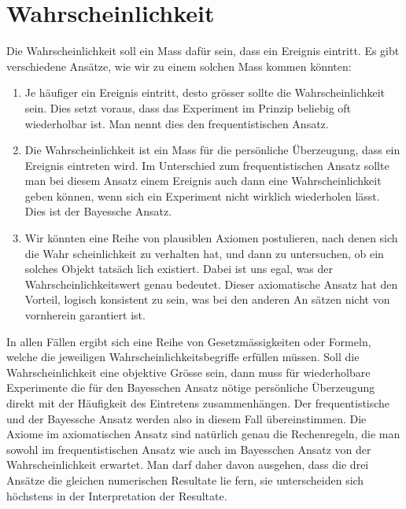 \documentclass[../Main.tex]{subfiles}
\begin{document}
\section{Wahrscheinlichkeit}
Die Wahrscheinlichkeit soll ein Mass dafür sein, dass ein Ereignis eintritt. Es gibt verschiedene Ansätze, wie wir zu einem solchen Mass kommen könnten: 
\begin{enumerate}
    \item Je häufiger ein Ereignis eintritt, desto grösser sollte die Wahrscheinlichkeit sein. Dies setzt voraus, dass das Experiment im Prinzip beliebig oft wiederholbar ist. Man nennt dies den frequentistischen Ansatz. 
    \item Die Wahrscheinlichkeit ist ein Mass für die persönliche Überzeugung, dass ein Ereignis eintreten wird. Im Unterschied zum frequentistischen Ansatz sollte man bei diesem Ansatz einem Ereignis auch dann eine Wahrscheinlichkeit geben können, wenn sich ein Experiment nicht wirklich wiederholen lässt. Dies ist der Bayessche Ansatz. 
    \item Wir könnten eine Reihe von plausiblen Axiomen postulieren, nach denen sich die Wahr scheinlichkeit zu verhalten hat, und dann zu untersuchen, ob ein solches Objekt tatsäch lich existiert. Dabei ist uns egal, was der Wahrscheinlichkeitswert genau bedeutet. Dieser axiomatische Ansatz hat den Vorteil, logisch konsistent zu sein, was bei den anderen An sätzen nicht von vornherein garantiert ist. 
\end{enumerate}

In allen Fällen ergibt sich eine Reihe von Gesetzmässigkeiten oder Formeln, welche die jeweiligen Wahrscheinlichkeitsbegriffe erfüllen müssen. Soll die Wahrscheinlichkeit eine objektive Grösse sein, dann muss für wiederholbare Experimente die für den Bayesschen Ansatz nötige persönliche Überzeugung direkt mit der Häufigkeit des Eintretens zusammenhängen. Der frequentistische und der Bayessche Ansatz werden also in diesem Fall übereinstimmen. Die Axiome im axiomatischen Ansatz sind natürlich genau die Rechenregeln, die man sowohl im frequentistischen Ansatz wie auch im Bayesschen Ansatz von der Wahrscheinlichkeit erwartet. Man darf daher davon ausgehen, dass die drei Ansätze die gleichen numerischen Resultate lie fern, sie unterscheiden sich höchstens in der Interpretation der Resultate.

\end{document}
